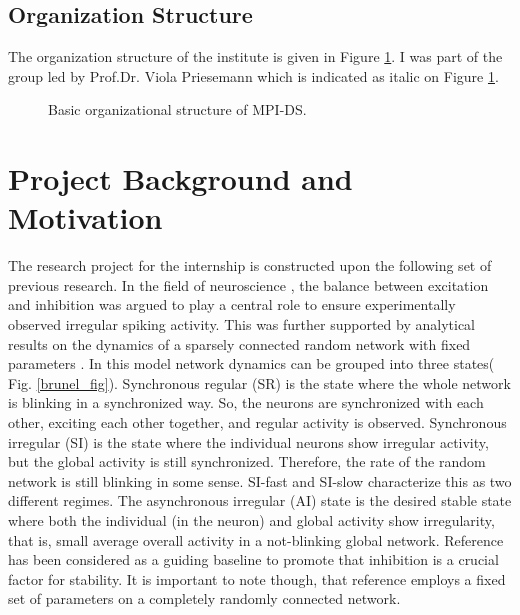 \documentclass[a4paper,12pt]{article}
\begin{document}
\subsection{Organization Structure}
The organization structure of the institute is given in Figure \ref{organization}. I was part of the group led by Prof.Dr. Viola Priesemann which is indicated as italic on Figure \ref{organization}.

\begin{figure}[H] 
    \caption{Basic organizational structure of MPI-DS.}
    \label{organization}
\end{figure}

\section{Project Background and Motivation}
The research project for the internship is constructed upon the following set of previous research. In the field of neuroscience \cite{CHAOS}, the balance between excitation and inhibition was argued to play a central role to ensure experimentally observed irregular spiking activity. This was further supported by analytical results on the dynamics of a sparsely connected random network with fixed parameters \cite{brunel}. In this model network dynamics can be grouped into three states( Fig. \ref{brunel_fig}). Synchronous regular (SR) is the state where the whole network is blinking in a synchronized way. So, the neurons are synchronized with each other, exciting each other together, and regular activity is observed. Synchronous irregular (SI) is the state where the individual neurons show irregular activity, but the global activity is still synchronized. Therefore, the rate of the random network is still blinking in some sense. SI-fast and SI-slow characterize this as two different regimes. The asynchronous irregular (AI) state is the desired stable state where both the individual (in the neuron) and global activity show irregularity, that is, small average overall activity in a not-blinking global network. Reference \cite{brunel} has been considered as a guiding baseline to promote that inhibition is a crucial factor for stability. It is important to note though, that reference \cite{brunel} employs a fixed set of parameters on a completely randomly connected network.
\end{document}
